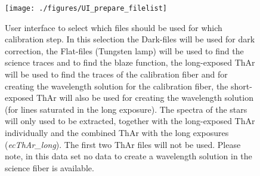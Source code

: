 \documentclass[10pt,a4paper]{article}
\begin{document}
\begin{figure} 
  \begin{center}
    \texttt{[image: ./figures/UI\_prepare\_filelist]}
  \end{center} 
  \caption{User interface to select which files should be used for which calibration step. In this selection the Dark-files will be used for dark correction, the Flat-files (Tungsten lamp) will be used to find the science traces and to find the blaze function, the long-exposed ThAr will be used to find the traces of the calibration fiber and for creating the wavelength solution for the calibration fiber, the short-exposed ThAr will also be used for creating the wavelength solution (for lines saturated in the long exposure). The spectra of the stars will only used to be extracted, together with the long-exposed ThAr individually and the combined ThAr with the long exposures (\textit{ecThAr\_long}). The first two ThAr files will not be used. Please note, in this data set no data to create a wavelength solution in the science fiber is available.
    \label{Fig:UI_prepare_filelist}}
\end{figure}
\end{document}
